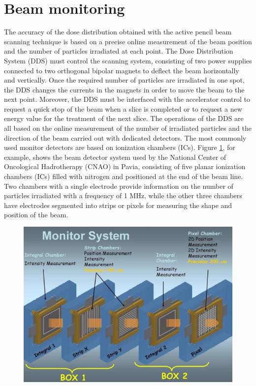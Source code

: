 \section{Beam monitoring}
\noindent The accuracy of the dose distribution obtained with the active pencil beam scanning technique is based on a precise online measurement of the beam position and the number of particles irradiated at each point.
The Dose Distribution System (DDS)\cite{pencil} must control the scanning system, consisting of two power supplies connected to two orthogonal bipolar magnets to deflect the beam horizontally and vertically.
Once the required number of particles are irradiated in one spot, the DDS changes the currents in the magnets in order to move the beam to the next point.
Moreover, the DDS must be interfaced with the accelerator control to request a quick stop of the beam when a slice is completed or to request a new energy value for the treatment of the next slice.
The operations of the DDS are all based on the online measurement of the number of irradiated particles and the direction of the beam carried out with dedicated detectors.
\newline
The most commonly used monitor detectors are based on ionization chambers (ICs).
Figure \ref{fig:monitor}, for example, shows the beam detector system used by the National Center of Oncological Hadrotherapy (CNAO) in Pavia, consisting of five planar ionization chambers (ICs) filled with nitrogen and positioned at the end of the beam line.
Two chambers with a single electrode provide information on the number of particles irradiated with a frequency of 1 MHz, while the other three chambers have electrodes segmented into strips or pixels for measuring the shape and position of the beam.
\begin{figure}[H]
	\centering
	\includegraphics[width=0.7\linewidth]{IMG/ch1/MonitorSystem.PNG}
	\caption{}
	\label{fig:monitor}
\end{figure}
